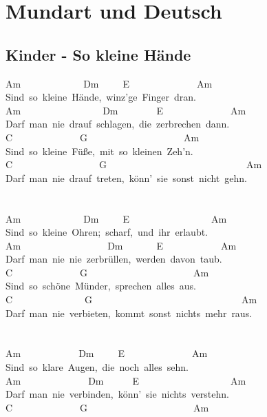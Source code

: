 \documentclass[]{book}
\let\stdsection\section
\renewcommand\section{\clearpage\stdsection}
\begin{document}
\hypertarget{mundart-und-deutsch}{%
\chapter{Mundart und Deutsch}\label{mundart-und-deutsch}}

\hypertarget{kinder---so-kleine-hande}{%
\section{Kinder - So kleine Hände}\label{kinder---so-kleine-hande}}

Am~~~~~~~~~~~~~Dm~~~~~E~~~~~~~~~~~~~~Am\\
Sind~so~kleine~Hände,~winz'ge~Finger~dran.\\
Am~~~~~~~~~~~~~~~~~Dm~~~~~~~~E~~~~~~~~~~~~~~Am\\
Darf~man~nie~drauf~schlagen,~die~zerbrechen~dann.\\
C~~~~~~~~~~~~~~G~~~~~~~~~~~~~~~~~~~~Am\\
Sind~so~kleine~Füße,~mit~so~kleinen~Zeh'n.\\
C~~~~~~~~~~~~~~~~~~G~~~~~~~~~~~~~~~~~~~~~~~~~~~~~Am\\
Darf~man~nie~drauf~treten,~könn'~sie~sonst~nicht~gehn.\\
~\\
~\\
Am~~~~~~~~~~~~~Dm~~~~~E~~~~~~~~~~~~~~~~~Am\\
Sind~so~kleine~Ohren;~scharf,~und~ihr~erlaubt.\\
Am~~~~~~~~~~~~~~~~~~Dm~~~~~~~E~~~~~~~~~~~~Am\\
Darf~man~nie~nie~zerbrüllen,~werden~davon~taub.\\
C~~~~~~~~~~~~~~G~~~~~~~~~~~~~~~~~~~~~~Am\\
Sind~so~schöne~Münder,~sprechen~alles~aus.\\
C~~~~~~~~~~~~~~~G~~~~~~~~~~~~~~~~~~~~~~~~~~~~~~~Am\\
Darf~man~nie~verbieten,~kommt~sonst~nichts~mehr~raus.\\
~\\
~\\
Am~~~~~~~~~~~~Dm~~~~~E~~~~~~~~~~~~~~Am\\
Sind~so~klare~Augen,~die~noch~alles~sehn.\\
Am~~~~~~~~~~~~~~Dm~~~~~~E~~~~~~~~~~~~~~~~~~~Am\\
Darf~man~nie~verbinden,~könn'~sie~nichts~verstehn.\\
C~~~~~~~~~~~~~~G~~~~~~~~~~~~~~~~~~~~~~Am\\
\end{document}
